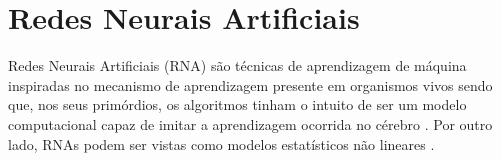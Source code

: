\documentclass{automatextcc}
\begin{document}
\section{Redes Neurais Artificiais}

Redes Neurais Artificiais (RNA) são técnicas de aprendizagem de máquina inspiradas no mecanismo de aprendizagem presente em organismos vivos \citep{aggarwal2018} sendo que, nos seus primórdios, os algoritmos tinham o intuito de ser um modelo computacional capaz de imitar a aprendizagem ocorrida no cérebro \citep{goodfellow2016}.  Por outro lado, RNAs podem ser vistas como modelos estatísticos não lineares \citep{hastie2009}.
\end{document}
